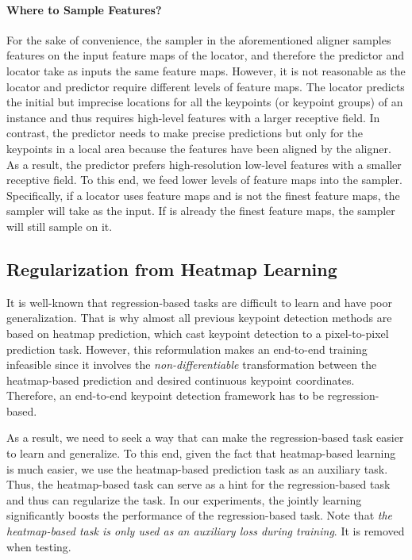 \documentclass[10pt,twocolumn,letterpaper]{article}
\newcommand{\1}{{\mathbbm{1}}}
\begin{document}
{\paragraph{Where to Sample Features?} For the sake of convenience, the sampler in the aforementioned aligner samples features on the input feature maps of the locator, and therefore the predictor and locator take as inputs the same feature maps. However, it is not reasonable as the locator and predictor require different levels of feature maps. The locator predicts the initial but imprecise locations for all the keypoints (or keypoint groups) of an instance and thus requires high-level features with a larger receptive field. In contrast, the predictor needs to make precise predictions but only for the keypoints in a local area because the features have been aligned by the aligner. As a result, the predictor prefers high-resolution low-level features with a smaller receptive field. To this end, we feed lower levels of feature maps into the sampler. Specifically, if a locator uses feature maps  and  is not the finest feature maps, the sampler will take  as the input. If  is already the finest feature maps, the sampler will still sample on it.

\subsection{Regularization from Heatmap Learning}
It is well-known that regression-based tasks are difficult to learn \cite{glorot2010understanding, sun2018integral} and have poor generalization. That is why almost all previous keypoint detection methods \cite{cao2017realtime, he2017mask, wei2016convolutional, sun2019deep, newell2017associative} are based on heatmap prediction, which cast keypoint detection to a pixel-to-pixel prediction task. However, this reformulation makes an end-to-end training infeasible since it involves the \emph{non-differentiable} transformation between the heatmap-based prediction and desired continuous keypoint coordinates. Therefore, an end-to-end keypoint detection framework has to be regression-based.

As a result, we need to seek a way that can make the regression-based task easier to learn and generalize. To this end, given the fact that heatmap-based learning is much easier, we use the heatmap-based prediction task as an auxiliary task.
Thus,
the heatmap-based task can serve as a hint for the regression-based task and thus can regularize the task. In our experiments, the jointly learning significantly boosts the performance of the regression-based task. Note that \emph{the heatmap-based task is only used as an auxiliary loss during training}. It is
removed when testing.

}
\end{document}
